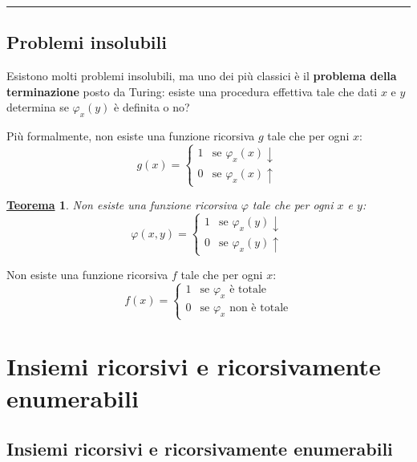 \documentclass[a4paper]{article}
\newtheorem{theorem}{\textcolor{Red3}{\underline{Teorema}}}
\newcommand{\longline}{\noindent\rule{\textwidth}{0.4pt}}
\begin{document}
	\longline

	\subsection{Problemi insolubili}
	
	Esistono molti problemi insolubili, ma uno dei più classici è il \textcolor{Red3}{\textbf{problema della terminazione}} posto da Turing: esiste una procedura effettiva tale che dati $x$ e $y$ determina se $\varphi_{x}\left(y\right)$ è definita o no?\newline
	
	\noindent
	Più formalmente, non esiste una funzione ricorsiva $g$ tale che per ogni $x$:
	\begin{equation*}
		g\left(x\right) = \begin{cases}
			1 & \text{se } \varphi_{x}\left(x\right) \downarrow \\
			0 & \text{se } \varphi_{x}\left(x\right) \uparrow
		\end{cases}
	\end{equation*}
	\begin{theorem}
		Non esiste una funzione ricorsiva $\varphi$ tale che per ogni $x$ e $y$:
		\begin{equation*}
			\varphi\left(x,y\right) = \begin{cases}
				1 & \text{se } \varphi_{x}\left(y\right) \downarrow \\
				0 & \text{se } \varphi_{x}\left(y\right) \uparrow
			\end{cases}
		\end{equation*}
	\end{theorem}
	\noindent
	Non esiste una funzione ricorsiva $f$ tale che per ogni $x$:
	\begin{equation*}
		f\left(x\right) = \begin{cases}
			1 & \text{se } \varphi_{x} \text{ è totale} \\
			0 & \text{se } \varphi_{x} \text{ non è totale}
		\end{cases}
	\end{equation*}\newpage
	
	\section{Insiemi ricorsivi e ricorsivamente enumerabili}
	
	\subsection{Insiemi ricorsivi e ricorsivamente enumerabili}
	
\end{document}
